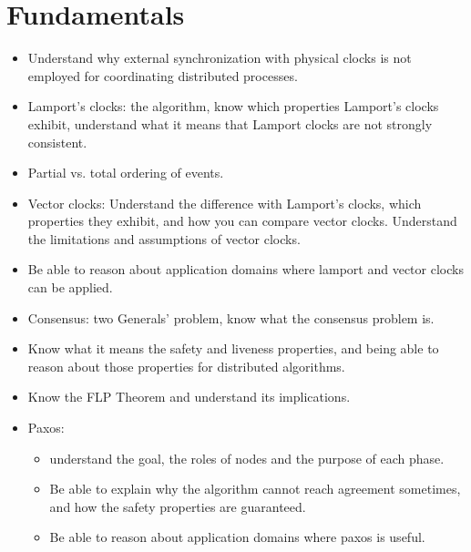 \documentclass[a4paper]{report}
\begin{document}
\chapter*{Fundamentals}
\begin{itemize}
\item Understand why external synchronization with physical clocks is not employed for
coordinating distributed processes.
\item Lamport’s clocks: the algorithm, know which properties Lamport’s clocks exhibit,
understand what it means that Lamport clocks are not strongly consistent.
\item Partial vs. total ordering of events.
\item Vector clocks: Understand the difference with Lamport’s clocks, which properties they
exhibit, and how you can compare vector clocks. Understand the limitations and
assumptions of vector clocks.
\item Be able to reason about application domains where lamport and vector clocks can be
applied.
\item Consensus: two Generals’ problem, know what the consensus problem is.
\item Know what it means the safety and liveness properties, and being able to reason
about those properties for distributed algorithms.
\item Know the FLP Theorem and understand its implications.
\item Paxos:
\begin{itemize}

\item understand the goal, the roles of nodes and the purpose of each phase.
\item Be able to explain why the algorithm cannot reach agreement sometimes, and how
the safety properties are guaranteed.
\item Be able to reason about application domains where paxos is useful.
\end{itemize}
\end{itemize}
\end{document}
